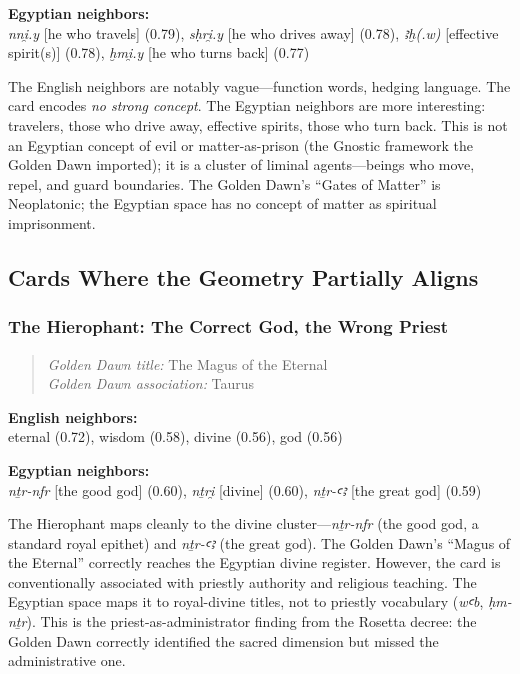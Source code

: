\documentclass[11pt, a4paper]{article}
\begin{document}
\noindent\textbf{Egyptian neighbors:}\\
\hspace{1em}\textit{nni̯.y} [he who travels] (0.79), \textit{sḥri̯.y} [he who drives away] (0.78), \textit{ꜣḫ(.w)} [effective spirit(s)] (0.78), \textit{ḫmi̯.y} [he who turns back] (0.77)

\vspace{6pt}
 The English neighbors are notably vague---function words, hedging language. The card encodes \textit{no strong concept}. The Egyptian neighbors are more interesting: travelers, those who drive away, effective spirits, those who turn back. This is not an Egyptian concept of evil or matter-as-prison (the Gnostic framework the Golden Dawn imported); it is a cluster of liminal agents---beings who move, repel, and guard boundaries. The Golden Dawn's ``Gates of Matter'' is Neoplatonic; the Egyptian space has no concept of matter as spiritual imprisonment.

\subsection{Cards Where the Geometry Partially Aligns}

\subsubsection{The Hierophant: The Correct God, the Wrong Priest}

\begin{quote}
\textit{Golden Dawn title:} The Magus of the Eternal \\
\textit{Golden Dawn association:} Taurus
\end{quote}

\noindent\textbf{English neighbors:}\\
\hspace{1em}eternal (0.72), wisdom (0.58), divine (0.56), god (0.56)

\noindent\textbf{Egyptian neighbors:}\\
\hspace{1em}\textit{nṯr-nfr} [the good god] (0.60), \textit{nṯri̯} [divine] (0.60), \textit{nṯr-ꜥꜣ} [the great god] (0.59)

\vspace{6pt}
 The Hierophant maps cleanly to the divine cluster---\textit{nṯr-nfr} (the good god, a standard royal epithet) and \textit{nṯr-ꜥꜣ} (the great god). The Golden Dawn's ``Magus of the Eternal'' correctly reaches the Egyptian divine register. However, the card is conventionally associated with priestly authority and religious teaching. The Egyptian space maps it to royal-divine titles, not to priestly vocabulary (\textit{wꜥb}, \textit{ḥm-nṯr}). This is the priest-as-administrator finding from the Rosetta decree: the Golden Dawn correctly identified the sacred dimension but missed the administrative one.
\end{document}

